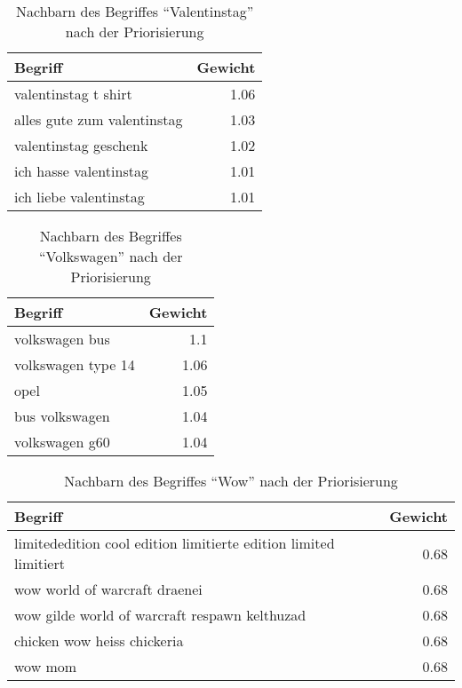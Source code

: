 \begin{table}[ht]
\centering
\begin{tabular*}{0.9\textwidth}{@{\extracolsep{\fill} } lr}
    \toprule
    Begriff & Gewicht \\
    \midrule
    valentinstag t shirt & \num{1.06} \\
    alles gute zum valentinstag & \num{1.03} \\
    valentinstag geschenk & \num{1.02} \\
    ich hasse valentinstag & \num{1.01} \\
    ich liebe valentinstag & \num{1.01} \\
    \bottomrule
\end{tabular*}
\caption{Nachbarn des Begriffes ``Valentinstag'' nach der Priorisierung}
\label{tab:prio_res_valentinstag}
\end{table}

\begin{table}[ht]
\centering
\begin{tabular*}{0.9\textwidth}{@{\extracolsep{\fill} } lr}
    \toprule
    Begriff & Gewicht \\
    \midrule
    volkswagen bus & \num{1.1} \\
    volkswagen type 14 & \num{1.06} \\
    opel & \num{1.05} \\
    bus volkswagen & \num{1.04} \\
    volkswagen g60 & \num{1.04} \\
    \bottomrule
\end{tabular*}
\caption{Nachbarn des Begriffes ``Volkswagen'' nach der Priorisierung}
\label{tab:prio_res_volkswagen}
\end{table}

\makeatletter
\setlength{\@fptop}{0pt}
\makeatother
\begin{table}[ht]
\centering
\begin{tabular*}{0.9\textwidth}{@{\extracolsep{\fill} } lr}
    \toprule
    Begriff & Gewicht \\
    \midrule
    limitededition cool edition limitierte edition limited limitiert & \num{0.68} \\
    wow world of warcraft draenei & \num{0.68} \\
    wow gilde world of warcraft respawn kelthuzad & \num{0.68} \\
    chicken wow heiss chickeria & \num{0.68} \\
    wow mom & \num{0.68} \\
    \bottomrule
\end{tabular*}
\caption{Nachbarn des Begriffes ``Wow'' nach der Priorisierung}
\label{tab:prio_res_wow}
\end{table}